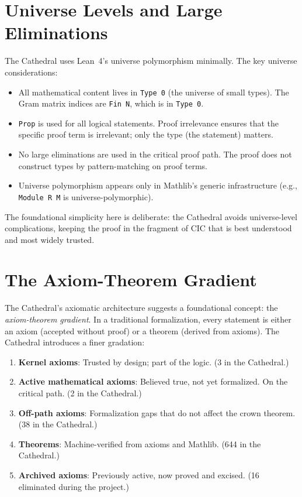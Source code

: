 \documentclass[11pt,a4paper]{article}
\theoremstyle{plain}
\theoremstyle{definition}
\newcommand{\lean}[1]{\texttt{#1}}
\begin{document}
\section{Universe Levels and Large Eliminations}
\label{sec:universes}

The Cathedral uses Lean~4's universe polymorphism minimally. The
key universe considerations:

\begin{itemize}
  \item All mathematical content lives in \lean{Type 0} (the universe
    of small types). The Gram matrix indices are \lean{Fin N}, which
    is in \lean{Type 0}.
  \item \lean{Prop} is used for all logical statements. Proof
    irrelevance ensures that the specific proof term is irrelevant;
    only the type (the statement) matters.
  \item No large eliminations are used in the critical proof path.
    The proof does not construct types by pattern-matching on proof
    terms.
  \item Universe polymorphism appears only in Mathlib's generic
    infrastructure (e.g., \lean{Module R M} is universe-polymorphic).
\end{itemize}

The foundational simplicity here is deliberate: the Cathedral avoids
universe-level complications, keeping the proof in the fragment of
CIC that is best understood and most widely trusted.

\section{The Axiom-Theorem Gradient}
\label{sec:gradient}

The Cathedral's axiomatic architecture suggests a foundational
concept: the \emph{axiom-theorem gradient}. In a traditional
formalization, every statement is either an axiom (accepted without
proof) or a theorem (derived from axioms). The Cathedral introduces
a finer gradation:

\begin{enumerate}
  \item \textbf{Kernel axioms}: Trusted by design; part of the logic.
    (3 in the Cathedral.)
  \item \textbf{Active mathematical axioms}: Believed true, not yet
    formalized. On the critical path. (2 in the Cathedral.)
  \item \textbf{Off-path axioms}: Formalization gaps that do not
    affect the crown theorem. (38 in the Cathedral.)
  \item \textbf{Theorems}: Machine-verified from axioms and Mathlib.
    (644 in the Cathedral.)
  \item \textbf{Archived axioms}: Previously active, now proved and
    excised. (16 eliminated during the project.)
\end{enumerate}
\end{document}
